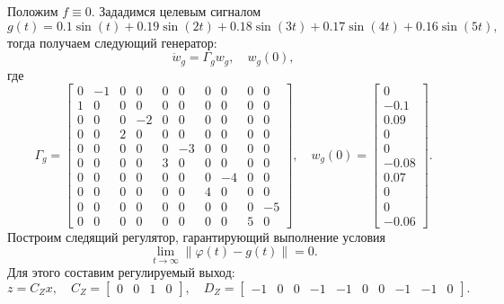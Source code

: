 Положим $f \equiv 0$. Зададимся целевым сигналом
\begin{equation*}
    g(t)=0.1\sin(t)+0.19\sin(2t)+0.18\sin(3t)+0.17\sin(4t)+0.16\sin(5t),
\end{equation*}
тогда получаем следующий генератор:
\begin{equation}
    \label{eq:5.2.gen}
    \dot w_g=\Gamma_g w_g,\quad w_g(0),
\end{equation}
где
\begin{equation*}
    \Gamma_g=\begin{bmatrix}
0 & -1 & 0 & 0 & 0 & 0 & 0 & 0 & 0 & 0\\
1 & 0 & 0 & 0 & 0 & 0 & 0 & 0 & 0 & 0\\
0 & 0 & 0 & -2 & 0 & 0 & 0 & 0 & 0 & 0\\
0 & 0 & 2 & 0 & 0 & 0 & 0 & 0 & 0 & 0\\
0 & 0 & 0 & 0 & 0 & -3 & 0 & 0 & 0 & 0\\
0 & 0 & 0 & 0 & 3 & 0 & 0 & 0 & 0 & 0\\
0 & 0 & 0 & 0 & 0 & 0 & 0 & -4 & 0 & 0\\
0 & 0 & 0 & 0 & 0 & 0 & 4 & 0 & 0 & 0\\
0 & 0 & 0 & 0 & 0 & 0 & 0 & 0 & 0 & -5\\
0 & 0 & 0 & 0 & 0 & 0 & 0 & 0 & 5 & 0
     \end{bmatrix},\quad
        w_g(0)=\begin{bmatrix}
0\\
-0.1\\
0.09\\
0\\
0\\
-0.08\\
0.07\\
0\\
0\\
-0.06
        \end{bmatrix}.
\end{equation*}
Построим следящий регулятор, гарантирующий выполнение условия
\begin{equation}
    \label{eq:5.2.aim}
    \lim_{t \to \infty} \| \varphi(t) -g(t)\| = 0.
\end{equation}
Для этого составим регулируемый выход:
\begin{equation*}
    z=C_Zx,\quad C_Z=\begin{bmatrix}
        0 & 0 & 1 & 0
    \end{bmatrix},\quad
    D_Z=\begin{bmatrix}
        -1 & 0 & 0 & -1 & -1 & 0 & 0 & -1 & -1 & 0
    \end{bmatrix}.
\end{equation*}
